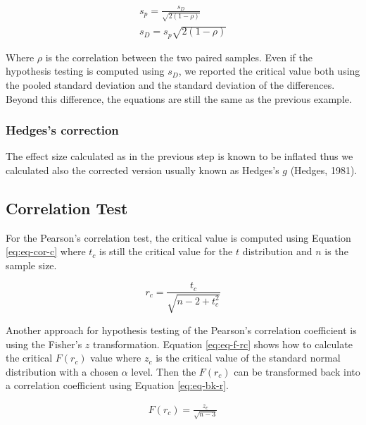 \documentclass[
  man]{apa7}
\begin{document}
\begin{equation}
    \label{eq:eq-sp-sd}
    \begin{gathered}
        s_p =  \frac{s_D}{\sqrt{2(1 - \rho)}} \\
        s_D =  s_p \sqrt{2(1 - \rho)}
    \end{gathered}
\end{equation}

Where \(\rho\) is the correlation between the two paired samples. Even if the hypothesis testing is computed using \(s_D\), we reported the critical value both using the pooled standard deviation and the standard deviation of the differences. Beyond this difference, the equations are still the same as the previous example.

\hypertarget{hedgess-correction}{%
\subsubsection{Hedges's correction}\label{hedgess-correction}}

The effect size calculated as in the previous step is known to be inflated thus we calculated also the corrected version usually known as Hedges's \(g\) (Hedges, 1981).

\hypertarget{correlation-test}{%
\subsection{Correlation Test}\label{correlation-test}}

For the Pearson's correlation test, the critical value is computed using Equation \eqref{eq:eq-cor-c} where \(t_c\) is still the critical value for the \(t\) distribution and \(n\) is the sample size.

\begin{equation}
    \label{eq:eq-cor-c}
    r_c = \frac{t_c}{\sqrt{n - 2 + t_c^2}}
\end{equation}

Another approach for hypothesis testing of the Pearson's correlation coefficient is using the Fisher's \(z\) transformation. Equation \eqref{eq:eq-f-rc} shows how to calculate the critical \(F(r_c)\) value where \(z_c\) is the critical value of the standard normal distribution with a chosen \(\alpha\) level. Then the \(F(r_c)\) can be transformed back into a correlation coefficient using Equation \eqref{eq:eq-bk-r}.

\begin{equation}
    \label{eq:eq-f-rc}
    \begin{gathered}
        F(r_c) = \frac{z_c}{\sqrt{n - 3}}
    \end{gathered}
\end{equation}
\end{document}
